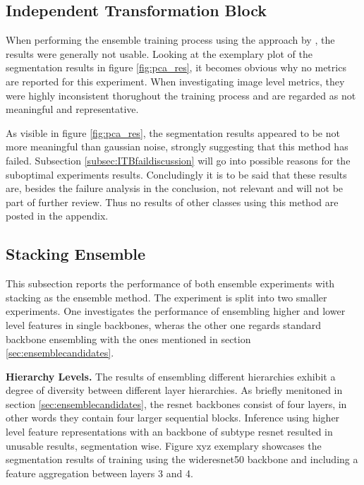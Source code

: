 \subsection{Independent Transformation Block}
\label{subsec:ITBfail}

When performing the ensemble training process using the approach by \cite{EnsembleHeller2023}, the results were generally not usable. Looking at the exemplary plot of the segmentation 
results in figure \ref{fig:pca_res}, it becomes obvious why no metrics are reported for this experiment. When investigating image level metrics, they were highly inconsistent thorughout 
the training process and are regarded as not meaningful and representative.



As visible in figure \ref{fig:pca_res}, the segmentation results appeared to be not more meaningful than gaussian noise, strongly suggesting that this method has failed. Subsection 
\ref{subsec:ITBfaildiscussion} will go into possible reasons for the suboptimal experiments results. Concludingly it is to be said that these results are, besides the failure analysis 
in the conclusion, not relevant and will not be part of further review. Thus no results of other classes using this method are posted in the appendix.

\subsection{Stacking Ensemble}
\label{subsec:stacking}
This subsection reports the performance of both ensemble experiments with stacking as the ensemble method. 
The experiment is split into two smaller experiments. One investigates the performance of ensembling higher and lower level features in 
single backbones, wheras the other one regards standard backbone ensembling with the ones mentioned in section \ref{sec:ensemblecandidates}. 






\textbf{Hierarchy Levels.} The results of ensembling different hierarchies exhibit a degree of diversity between different layer hierarchies. As briefly menitoned in section \ref{sec:ensemblecandidates}, the resnet backbones consist of four 
layers, in other words they contain four larger sequential blocks. Inference using higher level feature representations with an backbone of subtype resnet resulted in unusable results, segmentation wise. 
Figure xyz exemplary showcases the segmentation results of training using the wideresnet50 backbone and including a feature aggregation between layers 3 and 4. 

